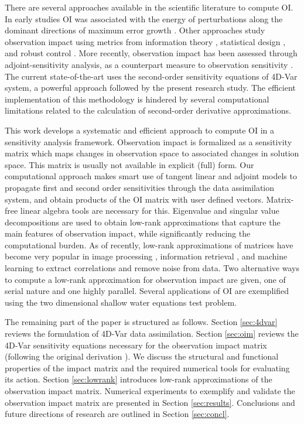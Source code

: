 \documentclass[final,sort&compress]{elsarticle}
\begin{document}
There are several approaches available in the scientific literature to compute OI. 
In early studies OI was associated with the energy of perturbations along the dominant directions of maximum error growth \cite{Palmer_1999, Sandu_HSV}. 
Other approaches study observation impact using metrics from information theory \cite{ZupInfoTheory,Singh_2012}, 
statistical design \cite{Berliner_1999}, and robust control \cite{TELLUSA17133}. 
More recently, observation impact has been assessed through adjoint-sensitivity analysis,
as a counterpart measure to observation sensitivity \cite{gelaro2007examination,gelaro2009examination,TELA:TELA349}.
The current state-of-the-art uses the second-order sensitivity equations of 4D-Var system\cite{LeDimet_1997,Daescu_2008,Daescu_2010},
a powerful approach followed by the present research study.
The efficient implementation of this methodology is hindered by several computational limitations
related to the calculation of second-order derivative approximations.

This work develops a systematic and efficient approach to compute OI in a sensitivity analysis framework.
Observation impact is formalized as a sensitivity matrix which maps changes in observation space 
to associated changes in solution space. This matrix is usually not available in explicit (full) form. 
Our computational approach makes smart use of tangent linear and adjoint models \cite{cacuci1981sensitivity,wang1992second,sandu2008discrete}
to propagate first and second order sensitivities through the data assimilation system, and obtain products of the OI matrix with user defined vectors.
Matrix-free linear algebra tools are necessary for this. 
Eigenvalue and singular value decompositions are used to obtain low-rank approximations that capture the main features of observation impact,
while significantly reducing the computational burden. 
As of recently, low-rank approximations of matrices have become very popular in image processing \cite{ye2005svdvision}, 
information retrieval \cite{berry1996low}, and machine learning \cite{dhillon2001concept} to extract correlations and 
remove noise from data. Two alternative ways to compute a low-rank approximation for observation impact are given,
one of serial nature and one highly parallel. 
Several applications of OI are exemplified using the two dimensional shallow water equations test problem.


The remaining part of the paper is structured as follows. 
Section \ref{sec:4dvar} reviews the formulation of 4D-Var data assimilation.
Section \ref{sec:oim} reviews the 4D-Var sensitivity equations necessary for
the observation impact matrix (following the original derivation \cite{Daescu_2008}). 
We discuss the structural and functional properties of the impact matrix and the required numerical tools for evaluating its action.
Section \ref{sec:lowrank} introduces low-rank approximations of the observation impact matrix. 
Numerical experiments to exemplify and validate the observation impact matrix are presented in Section \ref{sec:results}. 
Conclusions and future directions of research are outlined in Section \ref{sec:concl}.
\end{document}
